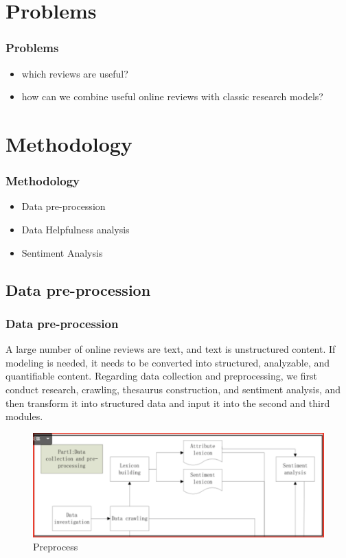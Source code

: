 \documentclass{beamer}
\begin{document}
\section{Problems}
\begin{frame}
    \frametitle{Problems}
    \begin{itemize}
        \item which reviews are useful?
        \item how can we combine useful online reviews with classic research models?
    \end{itemize}
\end{frame}

\section{Methodology}
\begin{frame}
    \frametitle{Methodology}
    \begin{itemize}
        \item Data pre-procession
        \item Data Helpfulness analysis
        \item Sentiment Analysis
    \end{itemize}
\end{frame}

\subsection{Data pre-procession}
\begin{frame}
    \frametitle{Data pre-procession}
    A large number of online reviews are text, and text is unstructured content. If modeling is needed, it needs to be converted into structured, analyzable, and quantifiable content. Regarding data collection and preprocessing, we first conduct research, crawling, thesaurus construction, and sentiment analysis, and then transform it into structured data and input it into the second and third modules.
    \begin{figure}[]
        \centering
        \includegraphics[width=0.6\linewidth]{fig/preprocess}
        \caption{Preprocess}
    \end{figure}
\end{frame}
\end{document}
